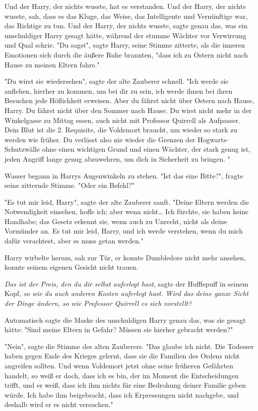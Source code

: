 {Und der Harry, der nichts wusste, hat es verstanden. Und der Harry, der nichts wusste, sah, dass es das Kluge, das Weise, das Intelligente und Vernünftige war, das Richtige zu tun. Und der Harry, der nichts wusste, sagte genau das, was ein unschuldiger Harry gesagt hätte, während der stumme Wächter vor Verwirrung und Qual schrie. "Du sagst", sagte Harry, seine Stimme zitterte, als die inneren Emotionen sich durch die äußere Ruhe brannten, "dass ich zu Ostern nicht nach Hause zu meinen Eltern fahre."

"Du wirst sie wiedersehen", sagte der alte Zauberer schnell. "Ich werde sie anflehen, hierher zu kommen, um bei dir zu sein, ich werde ihnen bei ihren Besuchen jede Höflichkeit erweisen. Aber du fährst nicht über Ostern nach Hause, Harry. Du fährst nicht über den Sommer nach Hause. Du wirst nicht mehr in der Winkelgasse zu Mittag essen, auch nicht mit Professor Quirrell als Aufpasser. Dein Blut ist die 2. Requisite, die Voldemort braucht, um wieder so stark zu werden wie früher. Du verlässt also nie wieder die Grenzen der Hogwarts-Schutzwälle ohne einen wichtigen Grund und einen Wächter, der stark genug ist, jeden Angriff lange genug abzuwehren, um dich in Sicherheit zu bringen. "

Wasser begann in Harrys Augenwinkeln zu stehen. "Ist das eine Bitte?", fragte seine zitternde Stimme. "Oder ein Befehl?"

"Es tut mir leid, Harry", sagte der alte Zauberer sanft. "Deine Eltern werden die Notwendigkeit einsehen, hoffe ich; aber wenn nicht… Ich fürchte, sie haben keine Handhabe; das Gesetz erkennt sie, wenn auch zu Unrecht, nicht als deine Vormünder an. Es tut mir leid, Harry, und ich werde verstehen, wenn du mich dafür verachtest, aber es muss getan werden."

Harry wirbelte herum, sah zur Tür, er konnte Dumbledore nicht mehr ansehen, konnte seinem eigenen Gesicht nicht trauen.

\emph{Das ist der Preis, den du dir selbst auferlegt hast}, sagte der Hufflepuff in seinem Kopf, \emph{so wie du auch anderen Kosten auferlegt hast. Wird das deine ganze Sicht der Dinge ändern, so wie Professor Quirrell es sich vorstellt?}

Automatisch sagte die Maske des unschuldigen Harry genau das, was sie gesagt hätte: "Sind meine Eltern in Gefahr? Müssen sie hierher gebracht werden?"

"Nein", sagte die Stimme des alten Zauberers. "Das glaube ich nicht. Die Todesser haben gegen Ende des Krieges gelernt, dass sie die Familien des Ordens nicht angreifen sollten. Und wenn Voldemort jetzt ohne seine früheren Gefährten handelt, so weiß er doch, dass ich es bin, der im Moment die Entscheidungen trifft, und er weiß, dass ich ihm nichts für eine Bedrohung deiner Familie geben würde. Ich habe ihm beigebracht, dass ich Erpressungen nicht nachgebe, und deshalb wird er es nicht versuchen."

}
